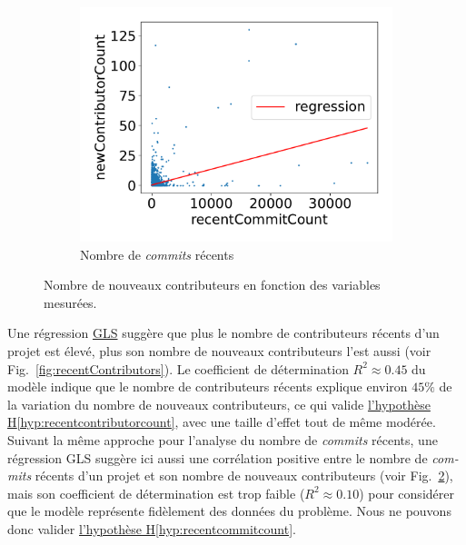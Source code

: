 \documentclass[dvipsnames,runningheads]{llncs}
\newcommand{\en}[1]{\foreignlanguage{english}{\emph{#1}}}
\begin{document}
\begin{figure}
\begin{subfigure}[t]{0.333\textwidth}
        \end{subfigure}%
        \begin{subfigure}[t]{0.333\textwidth}
            \includegraphics[width=\textwidth]{../experiment/data_analysis/recentCommitCountRegression_linearScale}
            \caption{Nombre de \emph{commits} récents}
            \label{fig:recentCommits}
        \end{subfigure}%

        \caption{Nombre de nouveaux contributeurs en fonction des variables mesurées.}
    \end{figure}

    Une régression
    \href{https://www.statsmodels.org/dev/generated/statsmodels.regression.linear_model.GLS.html}{GLS} suggère
    que plus le nombre de contributeurs récents d'un projet est élevé, plus son nombre de nouveaux
    contributeurs l'est aussi (voir Fig.~\ref{fig:recentContributors}). Le coefficient de détermination $R^2
    \approx 0.45$ du modèle indique que le nombre de contributeurs récents explique environ $45\%$ de la
    variation du nombre de nouveaux contributeurs, ce qui valide
    \hyperref[hyp:recentcontributorcount]{l'hypothèse H\ref*{hyp:recentcontributorcount}}, avec une taille
    d'effet tout de même modérée. Suivant la même approche pour l'analyse du nombre de \en{commits} récents,
    une régression GLS suggère ici aussi une corrélation positive entre le nombre de \en{commits} récents d'un
    projet et son nombre de nouveaux contributeurs (voir Fig.~\ref{fig:recentCommits}), mais son coefficient
    de détermination est trop faible ($R^2 \approx 0.10$) pour considérer que le modèle représente fidèlement
    des données du problème. Nous ne pouvons donc valider \hyperref[hyp:recentcommitcount]{l'hypothèse
    H\ref*{hyp:recentcommitcount}}.
\end{document}
